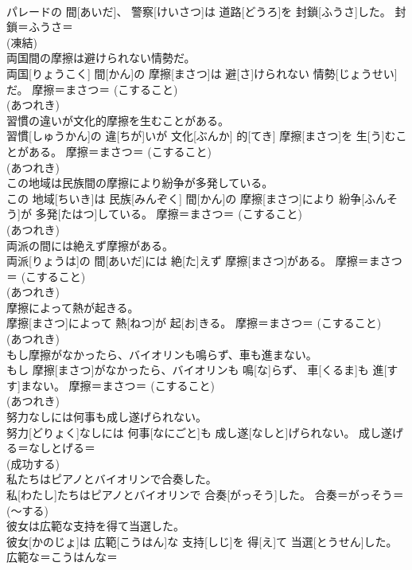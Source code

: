\documentclass[8pt]{extreport}
\begin{document}
\begin{CJK}{UTF8}{min}
{\\	パレードの 間[あいだ]、 警察[けいさつ]は 道路[どうろ]を 封鎖[ふうさ]した。	封鎖＝ふうさ＝ 
\\	(凍結) 
\\	両国間の摩擦は避けられない情勢だ。	
\\	両国[りょうこく] 間[かん]の 摩擦[まさつ]は 避[さ]けられない 情勢[じょうせい]だ。	摩擦＝まさつ＝ (こすること) 
\\	(あつれき) 
\\	習慣の違いが文化的摩擦を生むことがある。	
\\	習慣[しゅうかん]の 違[ちが]いが 文化[ぶんか] 的[てき] 摩擦[まさつ]を 生[う]むことがある。	摩擦＝まさつ＝ (こすること) 
\\	(あつれき) 
\\	この地域は民族間の摩擦により紛争が多発している。	
\\	この 地域[ちいき]は 民族[みんぞく] 間[かん]の 摩擦[まさつ]により 紛争[ふんそう]が 多発[たはつ]している。	摩擦＝まさつ＝ (こすること) 
\\	(あつれき) 
\\	両派の間には絶えず摩擦がある。	
\\	両派[りょうは]の 間[あいだ]には 絶[た]えず 摩擦[まさつ]がある。	摩擦＝まさつ＝ (こすること) 
\\	(あつれき) 
\\	摩擦によって熱が起きる。	
\\	摩擦[まさつ]によって 熱[ねつ]が 起[お]きる。	摩擦＝まさつ＝ (こすること) 
\\	(あつれき) 
\\	もし摩擦がなかったら、バイオリンも鳴らず、車も進まない。	
\\	もし 摩擦[まさつ]がなかったら、バイオリンも 鳴[な]らず、 車[くるま]も 進[すす]まない。	摩擦＝まさつ＝ (こすること) 
\\	(あつれき) 
\\	努力なしには何事も成し遂げられない。	
\\	努力[どりょく]なしには 何事[なにごと]も 成し遂[なしと]げられない。	成し遂げる＝なしとげる＝ 
\\	(成功する) 
\\	私たちはピアノとバイオリンで合奏した。	
\\	私[わたし]たちはピアノとバイオリンで 合奏[がっそう]した。	合奏＝がっそう＝ 
\\	(〜する) 
\\	彼女は広範な支持を得て当選した。	
\\	彼女[かのじょ]は 広範[こうはん]な 支持[しじ]を 得[え]て 当選[とうせん]した。	広範な＝こうはんな＝ 
}
\end{CJK}
\end{document}
